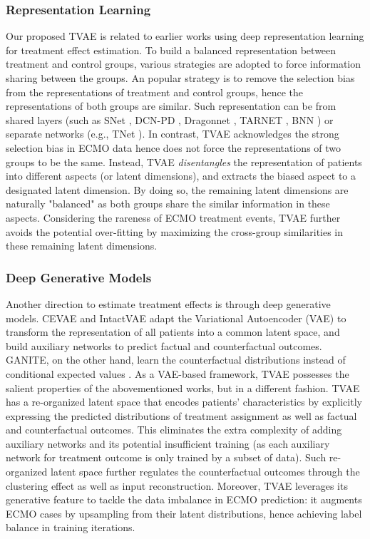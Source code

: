  \subsubsection{Representation Learning} 
 Our proposed TVAE is related to earlier works using deep representation learning for treatment effect estimation. To build a balanced representation between treatment and control groups, various strategies are adopted to force information sharing between the groups. An popular strategy is to remove the selection bias from the representations of treatment and control groups, hence the representations of both groups are similar. Such representation can be from shared layers (such as SNet \cite{curth2021st}, DCN-PD \cite{alaa2017dcnpd}, Dragonnet \cite{shi2019adapting}, TARNET \cite{shalit2017tarnet}, BNN \cite{johansson2016bnn}) or separate networks (e.g., TNet \cite{curth2021st}). In contrast, TVAE acknowledges the strong selection bias in ECMO data hence does not force the representations of two groups to be the same. Instead, TVAE \textit{disentangles} the representation of patients into different aspects (or latent dimensions), and extracts the biased aspect to a designated latent dimension. By doing so, the remaining latent dimensions are naturally "balanced" as both groups share the similar information in these aspects. Considering the rareness of ECMO treatment events, TVAE further avoids the potential over-fitting by maximizing the cross-group similarities in these remaining latent dimensions. 
 
 \subsubsection{Deep Generative Models} 
 Another direction to estimate treatment effects is through deep generative models. CEVAE \cite{louizos2017cevae} and IntactVAE \cite{wu2021intact} adapt the Variational Autoencoder (VAE) to transform the representation of all patients into a common latent space, and build auxiliary networks to predict factual and counterfactual outcomes. GANITE, on the other hand, learn the counterfactual
distributions instead of conditional expected values \cite{yoon2018ganite}. 
As a VAE-based framework, TVAE possesses the salient properties of the abovementioned works, but in a different fashion. TVAE has a re-organized latent space that encodes patients' characteristics by explicitly expressing the predicted distributions of treatment assignment as well as factual and counterfactual outcomes. This eliminates the extra complexity of adding auxiliary networks and its potential insufficient training (as each auxiliary network for treatment outcome is only trained by a subset of data).  Such re-organized latent space further regulates the counterfactual outcomes through the clustering effect as well as input reconstruction. Moreover, TVAE leverages its generative feature to tackle the data imbalance in ECMO prediction: it augments ECMO cases by upsampling from their latent distributions, hence achieving label balance in training iterations. 
